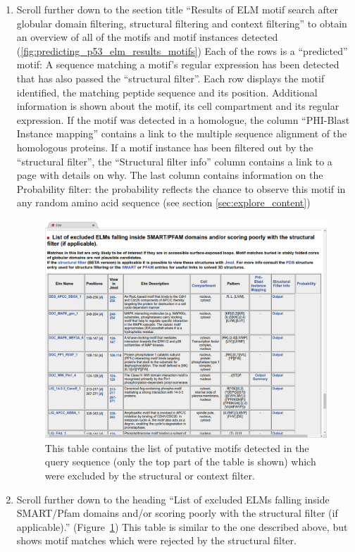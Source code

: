 \documentclass[12pt]{article}
\begin{document}
\begin{enumerate}
\item Scroll further down to the section title ``Results of ELM motif search
	after globular domain filtering, structural filtering and context
	filtering'' to obtain an overview of all of the motifs and motif
	instances detected
	(\ref{fig:predicting_p53_elm_results_motifs})
	Each of the rows is a ``predicted'' motif: A sequence matching a
	motif's regular expression has been detected that has also passed the
	``structural filter''.
	Each row displays the motif identified, the matching peptide
	sequence and its position. Additional information is shown about the
	motif, its cell compartment and its regular expression. If the motif
	was detected in a homologue, the column ``PHI-Blast Instance
	mapping'' contains a link to the multiple sequence alignment of the
	homologous proteins. If a motif instance has been filtered out
	by the ``structural filter'', the ``Structural filter info'' column
	contains a link to a page with details on why.
	The last column contains information on the Probability filter: the
	probability reflects the chance to observe this motif in any random
	amino acid sequence (see section \ref{sec:explore_content})

\begin{figure}[h!]
\centering
	\includegraphics[width=\textwidth]{Figures/predicting_p53/elm_results_motifs_filtered.png}
	\caption{
	This table contains the list of putative motifs detected in the query sequence (only
	the top part of the table is shown) which were excluded by the
	structural or context filter.
	}
	\label{fig:predicting_p53_elm_results_motifs_filtered}
\end{figure}

\item Scroll further down to the heading ``List of excluded ELMs falling inside
	SMART/Pfam domains and/or scoring poorly with the structural filter (if
	applicable).''
	(Figure~\ref{fig:predicting_p53_elm_results_motifs_filtered})
	This table is similar to the one described above, but shows motif
	matches which were rejected by the structural filter.
	
\end{enumerate}
\end{document}
